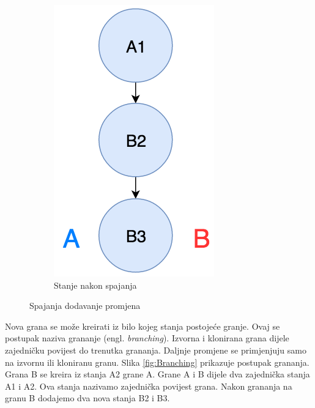 \documentclass[times, utf8, diplomski, numeric]{fer}
\newcommand{\eng}[1]{(engl. \textit{#1})}
\begin{document}
\begin{appendices}
\begin{figure}
\begin{subfigure}{.49\textwidth}
\includegraphics[scale=0.6]{FastForwardB}
\caption{Stanje nakon spajanja}
\label{fig:FastForwardB}
\end{subfigure}
\caption{Spajanja dodavanje promjena}
\label{fig:FastForward}
\end{figure}

Nova grana se može kreirati iz bilo kojeg stanja postojeće granje. Ovaj se postupak naziva grananje \eng{branching}. Izvorna i klonirana grana dijele zajedničku povijest do trenutka grananja. Daljnje promjene se primjenjuju samo na izvornu ili kloniranu granu. Slika \ref{fig:Branching} prikazuje postupak grananja. Grana B se kreira iz stanja A2 grane A. Grane A i B dijele dva zajednička stanja A1 i A2. Ova stanja nazivamo zajednička povijest grana. Nakon grananja na granu B dodajemo dva nova stanja B2 i B3.



\end{appendices}
\end{document}
